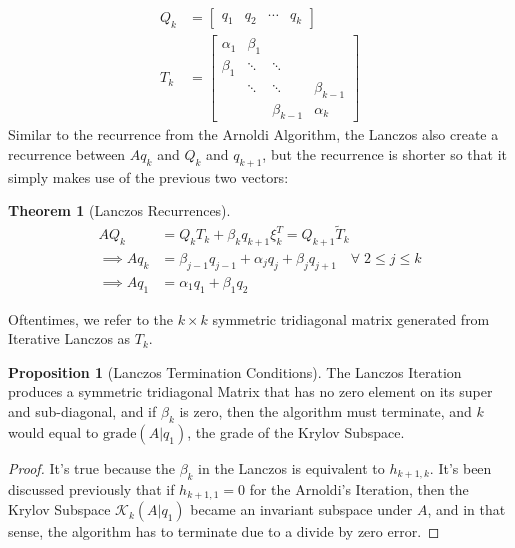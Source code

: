 \documentclass[]{article}
\theoremstyle{definition}
\newtheorem{theorem}{Theorem}            %
\newtheorem{prop}{Proposition}[section]  %
\begin{document}
            \begin{align}
                Q_k &= \begin{bmatrix}
                    q_1 & q_2 & \cdots & q_k
                \end{bmatrix}
                \\
                T_k &= 
                \begin{bmatrix}
                    \alpha_1 & \beta_1 & & 
                    \\[0.8em]
                    \beta_1 & \ddots & \ddots & 
                    \\[0.8em]
                    &\ddots &\ddots & \beta_{k - 1}
                    \\[0.8em]
                    & & \beta_{k - 1} & \alpha_k
                \end{bmatrix}
            \end{align}
            Similar to the recurrence from the Arnoldi Algorithm, the Lanczos also create a recurrence between $Aq_k$ and $Q_k$ and $q_{k + 1}$, but the recurrence is shorter so that it simply makes use of the previous two vectors: 
            \begin{theorem}[Lanczos Recurrences]
                \begin{align}
                    AQ_k &= Q_kT_k + \beta_k q_{k + 1}\xi_k^T = Q_{k + 1}\tilde{T}_k
                    \\
                    \implies Aq_k
                    &= \beta_{j - 1}q_{j - 1} + \alpha_j q_j + \beta_{j}q_{j + 1} \quad \forall\; 2\le j\le k
                    \\
                    \implies Aq_1 &= \alpha_1q_1 + \beta_1 q_2
                \end{align}    
            \end{theorem}
            \par
            Oftentimes, we refer to the $k\times k$ symmetric tridiagonal matrix generated from Iterative Lanczos as $T_k$. 
            \begin{prop}[Lanczos Termination Conditions]\label{prop:Lanczos_Termination_Conditions}
                The Lanczos Iteration produces a symmetric tridiagonal Matrix that has no zero element on its super and sub-diagonal, and if $\beta_k$ is zero, then the algorithm must terminate, and $k$ would equal to $\text{grade}(A|q_1)$, the grade of the Krylov Subspace. 
            \end{prop}
            \begin{proof}
                It's true because the $\beta_{k}$ in the Lanczos is equivalent to $h_{k + 1, k}$. It's been discussed previously that if $h_{k + 1, 1} = 0$ for the Arnoldi's Iteration, then the Krylov Subspace $\mathcal K_k(A|q_1)$ became an invariant subspace under $A$, and in that sense, the algorithm has to terminate due to a divide by zero error. 
            \end{proof}
\end{document}

